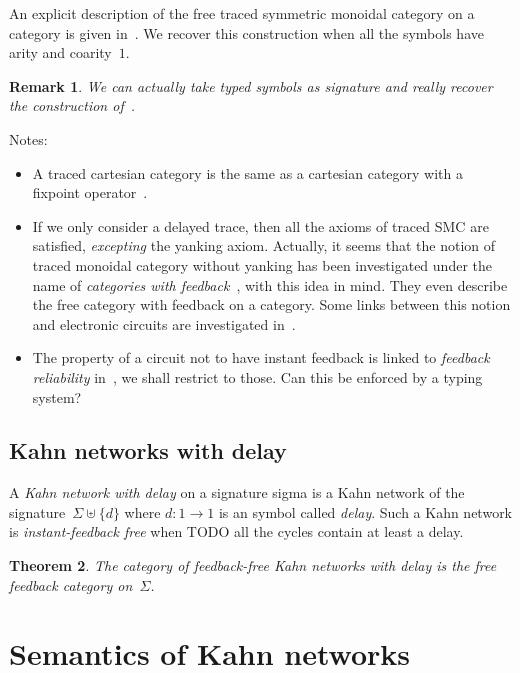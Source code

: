\documentclass{article}
\newtheorem{theorem}{Theorem}
\newtheorem{remark}[theorem]{Remark}
\begin{document}
An explicit description of the free traced symmetric monoidal category on a
category is given in~\cite{abramsky:traced-compact-closed}. We recover this
construction when all the symbols have arity and coarity~$1$.

\begin{remark}
  We can actually take typed symbols as signature and really recover the
  construction of~\cite{abramsky:traced-compact-closed}.
\end{remark}

Notes:
\begin{itemize}
\item A traced cartesian category is the same as a cartesian category with a
  fixpoint operator~\cite{hasegawa1997recursion}.
\item If we only consider a delayed trace, then all the axioms of traced SMC are
  satisfied, \emph{excepting} the yanking axiom. Actually, it seems that the
  notion of traced monoidal category without yanking has been investigated under
  the name of \emph{categories with feedback}~\cite{katis2002feedback}, with
  this idea in mind. They even describe the free category with feedback on a
  category. Some links between this notion and electronic circuits are
  investigated in~\cite{katis1999algebra}.
\item The property of a circuit not to have instant feedback is linked to
  \emph{feedback reliability} in~\cite{pardo2004synchronous}, we shall restrict
  to those. Can this be enforced by a typing system?
\end{itemize}

\subsection{Kahn networks with delay}
A \emph{Kahn network with delay} on a signature sigma is a Kahn network of the
signature~$\Sigma\uplus\{d\}$ where $d:1\to 1$ is an symbol called
\emph{delay}. Such a Kahn network is \emph{instant-feedback free} when TODO all
the cycles contain at least a delay.

\begin{theorem}
  The category of feedback-free Kahn networks with delay is the free feedback
  category on~$\Sigma$.
\end{theorem}


\section{Semantics of Kahn networks}
\end{document}
